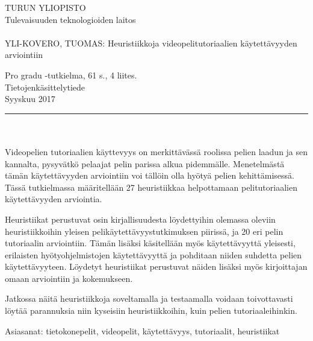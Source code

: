 \documentclass[12pt, a4paper]{report}
\begin{document}
\begin{minipage}{15cm}
	\noindent
	TURUN YLIOPISTO\\
	Tulevaisuuden teknologioiden laitos\\
	\\
	YLI-KOVERO, TUOMAS: Heuristiikkoja videopelitutoriaalien käytettävyyden arviointiin
	
	Pro gradu -tutkielma, 61 s., 4 liites.\\
	Tietojenkäsittelytiede\\	
	Syyskuu 2017\\
	\rule{\textwidth}{.2mm}\\
	\\
	Videopelien tutoriaalien käyttevyys on merkittävässä roolissa pelien laadun ja sen kannalta, pysyvätkö pelaajat pelin parissa alkua pidemmälle. Menetelmästä tämän käytettävyyden arviointiin voi tällöin olla hyötyä pelien kehittämisessä. Tässä tutkielmassa määritellään 27 heuristiikkaa helpottamaan pelitutoriaalien käytettävyyden arviointia. 
	
	\vspace{4mm}\noindent Heuristiikat perustuvat osin kirjallisuudesta löydettyihin olemassa oleviin heuris\-tiikkoihin yleisen pelikäytettävyystutkimuksen piirissä, ja 20 eri pelin tutoriaalin arviointiin. Tämän lisäksi käsitellään myös käytettävyyttä yleisesti, eri\-lais\-ten hyötyohjelmistojen käytettävyyttä ja pohditaan niiden suhdetta pelien käytettävyyteen. Löydetyt heuristiikat perustuvat näiden lisäksi myös kirjoittajan omaan arviointiin ja kokemukseen.
	
	\vspace{4mm}\noindent Jatkossa näitä heuristiikkoja soveltamalla ja testaamalla voidaan toivottavasti löytää parannuksia niin kyseisiin heuristiikkoihin, kuin pelien tutoriaaleihinkin.
	
	\vspace{4mm}\noindent Asiasanat: tietokonepelit, videopelit, käytettävyys, tutoriaalit, heuristiikat
	
\end{minipage}
\cleardoublepage
{}
\tableofcontents
\cleardoublepage
{}
\pagestyle{plain} 
\setcounter{page}{1}











\end{document}
